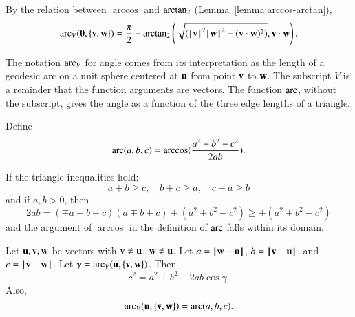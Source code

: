 By the relation between $\arccos$ and ${\operatorname{arctan_2}}$
(Lemma~\ref{lemma:arccos-arctan}), %
\begin{equation}\label{eqn:angle}
  \operatorname{arc}_V({\mathbf 0},\{{\mathbf v},{\mathbf w}\}) = \frac{\pi}2 - {\operatorname{arctan_2}}\left ({\sqrt{({{\hskip0.1em|\hskip-0.15em|\hskip0.1em}{\mathbf v}{\hskip0.1em|\hskip-0.15em|\hskip0.1em}}^2{{\hskip0.1em|\hskip-0.15em|\hskip0.1em}{\mathbf w}{\hskip0.1em|\hskip-0.15em|\hskip0.1em}}^2 -
        ({\mathbf v}\cdot {\mathbf w})^2)}}, {{\mathbf v}\cdot {\mathbf w}}\right).
\end{equation}
%

The notation $\operatorname{arc}_V$ for angle comes from its interpretation as the
length of a geodesic arc on a unit sphere
centered at ${\mathbf u}$ from point ${\mathbf v}$ to ${\mathbf w}$.
%
The subscript $V$ is a reminder that
the function arguments are vectors.  The function
$\operatorname{arc}$, without the subscript,  gives the angle as a function
of the three edge lengths of a triangle.
%
%
%


\begin{definition}[arc]\label{def:arc}
Define
\[ \operatorname{arc}(a,b,c) = \arccos(\frac{a^2 + b^2 - c^2}{2 a
    b}).\] 
%
\end{definition}

If the triangle inequalities hold:
\[ 
a + b \ge c,\quad b + c \ge a, \quad c+a \ge b
\] 
and if $a,b >0$, then
\[ 
  2 a b = (\mp a+b+c)(a \mp b \pm c) \pm (a^2 + b^2 - c^2) 
\ge \pm  (a^2 + b^2 - c^2)
\] 
and the argument of $\arccos$ in the definition of $\operatorname{arc}$ falls within
its domain.

\begin{lemma}\label{lemma:loc}
Let ${\mathbf u},{\mathbf v},{\mathbf w}$ be vectors with ${\mathbf v}\ne {\mathbf u}$, ${\mathbf w}\ne {\mathbf u}$.  Let $a
= \norm{\w }{ \u}$, $b = \norm{\v }{ \u}$, and $c = \norm{\v }{ \w}$.
Let $\gamma=\operatorname{arc}_V({\mathbf u},\{{\mathbf v},{\mathbf w}\})$.    Then
\[ c^2 = a^2 + b^2 - 2 a b \cos\gamma.\] 
Also,
\[ 
\operatorname{arc}_V({\mathbf u},\{{\mathbf v},{\mathbf w}\})= \operatorname{arc}(a,b,c).
\] 

\end{lemma}
%
%
%
%


